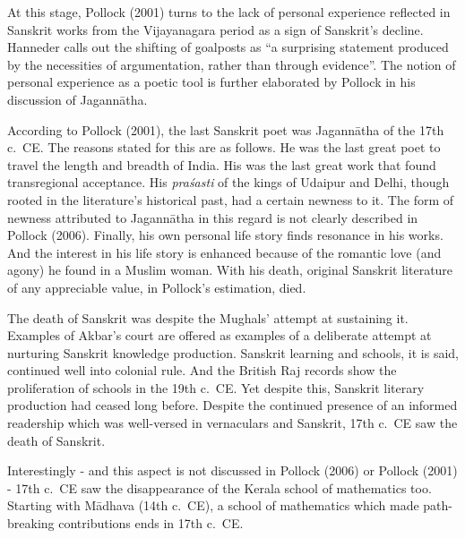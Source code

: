 At this stage, Pollock (2001) turns to the lack of personal experience reflected in Sanskrit works from the Vijayanagara period as a sign of Sanskrit’s decline. Hanneder calls out the shifting of goalposts as “a surprising statement produced by the necessities of argumentation, rather than through evidence”. The notion of personal experience as a poetic tool is further elaborated by Pollock in his discussion of Jagannātha. 
\vskip 1.5pt

According to Pollock (2001), the last Sanskrit poet was Jagannātha of the 17th c.\ CE. The reasons stated for this are as follows. He was the last great poet to travel the length and breadth of India. His was the last great work that found transregional acceptance. His {\sl praśasti} of the kings of Udaipur and Delhi, though rooted in the literature’s historical past, had a certain newness to it. The form of newness attributed to Jagannātha in this regard is not clearly described in Pollock (2006). Finally, his own personal life story finds resonance in his works. And the interest in his life story is enhanced because of the romantic love (and agony) he found in a Muslim woman. With his death, original Sanskrit literature of any appreciable value, in Pollock’s estimation, died.
\vskip 1.5pt

The death of Sanskrit was despite the Mughals’ attempt at sustaining it. Examples of Akbar’s court are offered as examples of a deliberate attempt at nurturing Sanskrit knowledge production. Sanskrit learning and schools, it is said, continued well into colonial rule. And the British Raj records show the proliferation of schools in the 19th c.\ CE. Yet despite this, Sanskrit literary production had ceased long before. Despite the continued presence of an informed readership which was well-versed in vernaculars and Sanskrit, 17th c.\ CE saw the death of Sanskrit.

Interestingly - and this aspect is not discussed in Pollock (2006) or Pollock (2001) - 17th c.\ CE saw the disappearance of the Kerala school of mathematics too. Starting with Mādhava (14th c.\ CE), a school of mathematics which made path-breaking contributions ends in 17th c.~CE.

